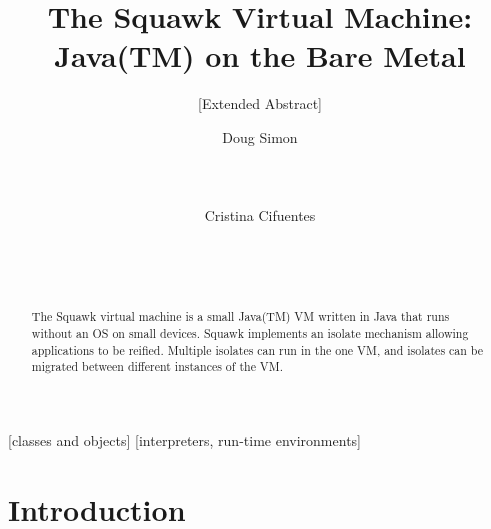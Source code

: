 \documentclass{sig-alt-sun}
\begin{document}
%

\title{The Squawk Virtual Machine: Java(TM) on the Bare Metal}
\subtitle{[Extended Abstract]}

\author{
\alignauthor Doug Simon \\
       \\
       \\
       \\
\alignauthor Cristina Cifuentes \\
       \\
       \\
       \\
}
\date{}
\maketitle

\begin{abstract}
The Squawk virtual machine is a small Java(TM) VM written in 
Java that runs without an OS on small devices.
Squawk implements an isolate mechanism 
allowing applications to be reified.  Multiple isolates 
can run in the one VM, and isolates can be migrated between
different instances of the VM.

\end{abstract}

[classes and objects]
[interpreters, run-time environments]



\section{Introduction}
\end{document}
